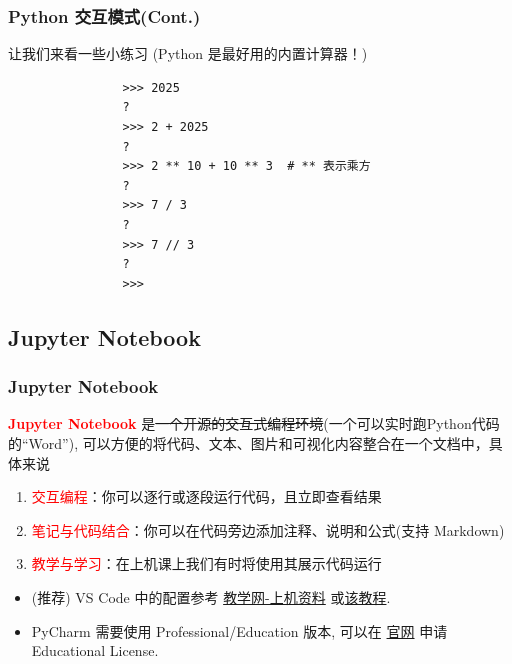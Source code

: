 \documentclass[handout]{ctexbeamer}
\begin{document}
        \begin{frame}[fragile]
            \frametitle{Python 交互模式(Cont.)}
            让我们来看一些小练习 (Python 是最好用的内置计算器！)
            \begin{verbatim}
                >>> 2025
                ?
                >>> 2 + 2025
                ?
                >>> 2 ** 10 + 10 ** 3  # ** 表示乘方
                ?
                >>> 7 / 3
                ?
                >>> 7 // 3
                ?
                >>> 
            \end{verbatim}
        \end{frame}
        
        \subsection{Jupyter Notebook}
        \begin{frame}[fragile]
            \frametitle{Jupyter Notebook}
            \textcolor{red}{\textbf{Jupyter Notebook}} 是\sout{一个开源的交互式编程环境}(一个可以实时跑Python代码的``Word''), 可以方便的将代码、文本、图片和可视化内容整合在一个文档中，具体来说
            \begin{enumerate}
                \item \textcolor{red}{交互编程}：你可以逐行或逐段运行代码，且立即查看结果
                \item \textcolor{red}{笔记与代码结合}：你可以在代码旁边添加注释、说明和公式(支持 Markdown)
                \item \textcolor{red}{教学与学习}：在上机课上我们有时将使用其展示代码运行
            \end{enumerate}
            \vspace{1em} \pause
            \begin{itemize}
                \item (推荐) VS Code 中的配置参考 \underline{教学网-上机资料} 或\href{https://empty-car-8ce.notion.site/Python-VS-Code-2025-2-19fc19e4eddc809ca536c937ebfe9e6b#19fc19e4eddc80849d9bca946e704150}{该教程}.
                \item PyCharm 需要使用 Professional/Education 版本, 可以在 \href{https://www.jetbrains.com/community/education/#students}{官网} 申请 Educational License.
            \end{itemize}

        \end{frame}
\end{document}
